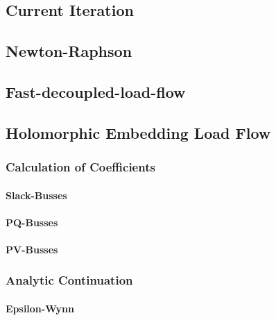 \subsection{Current Iteration}

\subsection{Newton-Raphson}

\subsection{Fast-decoupled-load-flow}

\subsection{Holomorphic Embedding Load Flow}

\subsubsection{Calculation of Coefficients}

\paragraph{Slack-Busses}

\paragraph{PQ-Busses}

\paragraph{PV-Busses}

\subsubsection{Analytic Continuation}

\paragraph{Epsilon-Wynn}
